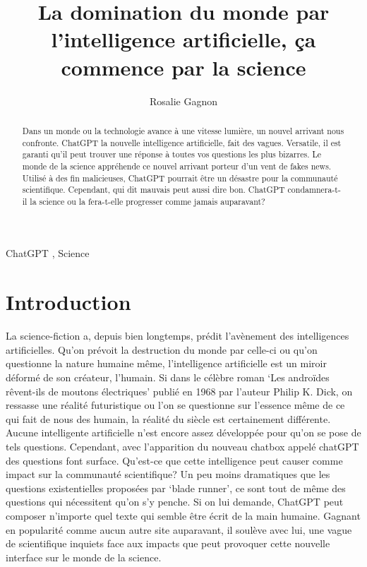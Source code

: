 \documentclass[preprint, 3p,
authoryear]{elsarticle} %
\begin{document}
\begin{frontmatter}

  \title{La domination du monde par l'intelligence artificielle, ça
commence par la science}
    \author[Université de Sherbrooke]{Rosalie Gagnon%
  }
  
  \begin{abstract}
  Dans un monde ou la technologie avance à une vitesse lumière, un
  nouvel arrivant nous confronte. ChatGPT la nouvelle intelligence
  artificielle, fait des vagues. Versatile, il est garanti qu'il peut
  trouver une réponse à toutes vos questions les plus bizarres. Le monde
  de la science appréhende ce nouvel arrivant porteur d'un vent de fakes
  news. Utilisé à des fin malicieuses, ChatGPT pourrait être un désastre
  pour la communauté scientifique. Cependant, qui dit mauvais peut aussi
  dire bon. ChatGPT condamnera-t-il la science ou la fera-t-elle
  progresser comme jamais auparavant?
  \end{abstract}
    \begin{keyword}
    ChatGPT \sep 
    Science
  \end{keyword}
  
 \end{frontmatter}

\hypertarget{introduction}{%
\section{\texorpdfstring{\textbf{Introduction}}{Introduction}}\label{introduction}}

La science-fiction a, depuis bien longtemps, prédit l'avènement des
intelligences artificielles. Qu'on prévoit la destruction du monde par
celle-ci ou qu'on questionne la nature humaine même, l'intelligence
artificielle est un miroir déformé de son créateur, l'humain. Si dans le
célèbre roman `Les androïdes rêvent-ils de moutons électriques' publié
en 1968 par l'auteur Philip K. Dick, on ressasse une réalité
futuristique ou l'on se questionne sur l'essence même de ce qui fait de
nous des humain, la réalité du siècle est certainement différente.
Aucune intelligente artificielle n'est encore assez développée pour
qu'on se pose de tels questions. Cependant, avec l'apparition du nouveau
chatbox appelé chatGPT des questions font surface. Qu'est-ce que cette
intelligence peut causer comme impact sur la communauté scientifique? Un
peu moins dramatiques que les questions existentielles proposées par
`blade runner', ce sont tout de même des questions qui nécessitent qu'on
s'y penche. Si on lui demande, ChatGPT peut composer n'importe quel
texte qui semble être écrit de la main humaine. Gagnant en popularité
comme aucun autre site auparavant, il soulève avec lui, une vague de
scientifique inquiets face aux impacts que peut provoquer cette nouvelle
interface sur le monde de la science.
\end{document}

